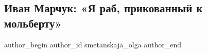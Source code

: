  
 
 
 
 
 
\subsection{Иван Марчук: «Я раб, прикованный к мольберту»}
\label{sec:23_11_2020.news.ua.fakty.smetanskaja_olga.1.marchuk_rab_molbert}
\ifcmt
	author_begin
   author_id smetanskaja_olga
	author_end
\fi
{}
